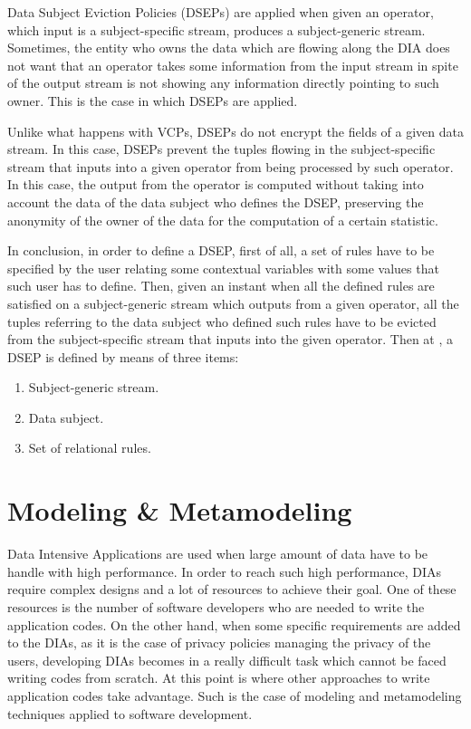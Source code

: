 Data Subject Eviction Policies (DSEPs) are applied when given an operator, which input is a subject-specific stream, produces a subject-generic stream. Sometimes, the entity who owns the data which are flowing along the DIA does not want that an operator takes some information from the input stream in spite of the output stream is not showing any information directly pointing to such owner. This is the case in which DSEPs are applied.

Unlike what happens with VCPs, DSEPs do not encrypt the fields of a given data stream. In this case, DSEPs prevent the tuples flowing in the subject-specific stream that inputs into a given operator from being processed by such operator. In this case, the output from the operator is computed without taking into account the data of the data subject who defines the DSEP, preserving the anonymity of the owner of the data for the computation of a certain statistic.

In conclusion, in order to define a DSEP, first of all, a set of rules have to be specified by the user relating some contextual variables with some values that such user has to define. Then, given an instant when all the defined rules are satisfied on a subject-generic stream which outputs from a given operator, all the tuples referring to the data subject who defined such rules have to be evicted from the subject-specific stream that inputs into the given operator. Then at \cite{privacypoliciesarticle}, a DSEP is defined by means of three items:

\begin{enumerate}

\item Subject-generic stream.
\item Data subject.
\item Set of relational rules.

\end{enumerate}

\section{Modeling \& Metamodeling}

Data Intensive Applications are used when large amount of data have to be handle with high performance. In order to reach such high performance, DIAs require complex designs and a lot of resources to achieve their goal. One of these resources is the number of software developers who are needed to write the application codes. On the other hand, when some specific requirements are added to the DIAs, as it is the case of privacy policies managing the privacy of the users, developing DIAs becomes in a really difficult task which cannot be faced writing codes from scratch. At this point is where other approaches to write application codes take advantage. Such is the case of modeling and metamodeling techniques applied to software development.


